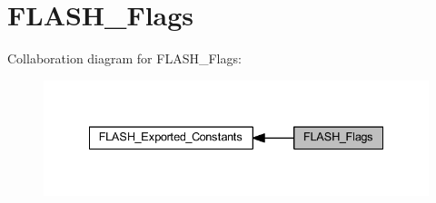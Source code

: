 \hypertarget{group___f_l_a_s_h___flags}{}\section{F\+L\+A\+S\+H\+\_\+\+Flags}
\label{group___f_l_a_s_h___flags}
Collaboration diagram for F\+L\+A\+S\+H\+\_\+\+Flags\+:
\nopagebreak
\begin{figure}[H]
\begin{center}
\leavevmode
\includegraphics[width=335pt]{group___f_l_a_s_h___flags}
\end{center}
\end{figure}
